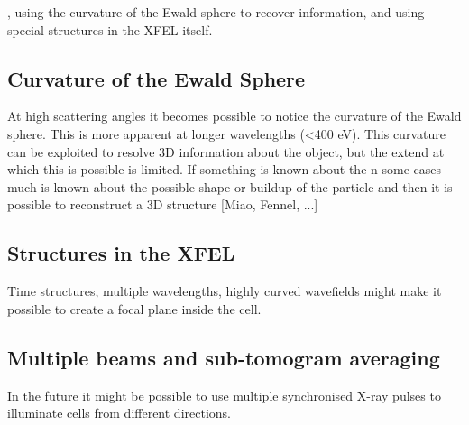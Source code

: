 , using the curvature of the Ewald sphere to recover information, and using special structures in the XFEL itself.
\subsection{Curvature of the Ewald Sphere}
At high scattering angles it becomes possible to notice the curvature of the Ewald sphere. This is more apparent at longer wavelengths (<400 eV). This curvature can be exploited to resolve 3D information about the object, but the extend at which this is possible is limited. If something is known about the n some cases much is known about the possible shape or buildup of the particle and then it is possible to reconstruct a 3D structure [Miao, Fennel, ...]

\subsection{Structures in the XFEL}
Time structures, multiple wavelengths, highly curved wavefields might make it possible to create a focal plane inside the cell. 

\subsection{Multiple beams and sub-tomogram averaging}
In the future it might be possible to use multiple synchronised X-ray pulses to illuminate cells from different directions. 